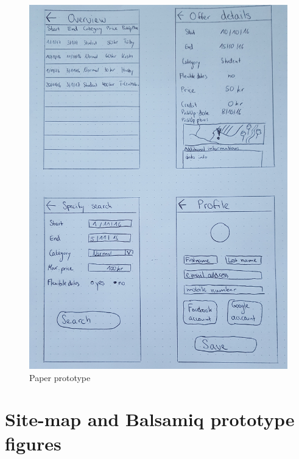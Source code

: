 \documentclass[11pt,twoside,a4paper]{report}
\begin{document}
\begin{appendices}
\begin{figure}
	\centering
	\includegraphics[width=\textwidth]{Paper_prototype2.jpg}
	\caption{Paper prototype}
	\label{paper prototype 2}
\end{figure}

\chapter{Site-map and Balsamiq prototype figures}
\label{chapter:site-map-and-balsamiq-prototype-figures}



\end{appendices}
\end{document}
